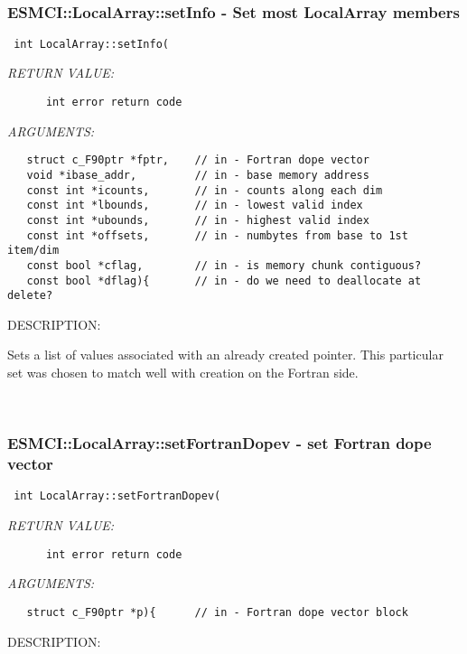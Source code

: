 \mbox{}\hrulefill\
 
\subsubsection [ESMCI::LocalArray::setInfo] {ESMCI::LocalArray::setInfo - Set most LocalArray members}


  
\begin{verbatim} int LocalArray::setInfo(\end{verbatim}{\em RETURN VALUE:}
\begin{verbatim}      int error return code\end{verbatim}{\em ARGUMENTS:}
\begin{verbatim}   struct c_F90ptr *fptr,    // in - Fortran dope vector
   void *ibase_addr,         // in - base memory address
   const int *icounts,       // in - counts along each dim
   const int *lbounds,       // in - lowest valid index
   const int *ubounds,       // in - highest valid index
   const int *offsets,       // in - numbytes from base to 1st item/dim
   const bool *cflag,        // in - is memory chunk contiguous?
   const bool *dflag){       // in - do we need to deallocate at delete?\end{verbatim}
{\sf DESCRIPTION:\\ }


    Sets a list of values associated with an already created pointer.
    This particular set was chosen to match well with creation on the
    Fortran side.
   
 
\mbox{}\hrulefill\
 
\subsubsection [ESMCI::LocalArray::setFortranDopev] {ESMCI::LocalArray::setFortranDopev - set Fortran dope vector}


  
\begin{verbatim} int LocalArray::setFortranDopev(\end{verbatim}{\em RETURN VALUE:}
\begin{verbatim}      int error return code\end{verbatim}{\em ARGUMENTS:}
\begin{verbatim}   struct c_F90ptr *p){      // in - Fortran dope vector block\end{verbatim}
{\sf DESCRIPTION:\\ }


